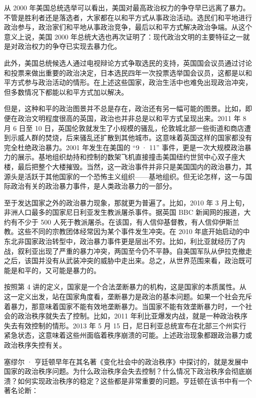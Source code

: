 从 2000 年美国总统选举可以看出，美国对最高政治权力的争夺早已远离了暴力。不管是胜利者还是落选者，大家都在以和平方式从事政治活动。选民们和平地进行政治参与，政治家们和平地从事政治竞争，最后以和平方式解决政治争端。从这个意义上说，美国 2000 年总统大选也再次证明了：现代政治文明的主要特征之一就是对政治权力的争夺已实现去暴力化。

此外，美国总统候选人通过电视辩论方式争取选民的支持，英国国会议员通过讨论和投票来做出重要的政治决定，日本选民四年一次投票选举国会议员，这都是以和平方式参与政治活动的情形。在上述这些国家，政治生活中也难免出现政治冲突，但多数情况下都能以和平方式加以解决。

但是，这种和平的政治图景并不总是存在，政治还有另一幅可能的图景。比如，即便在政治文明程度很高的英国，政治也并非总是以和平方式呈现出来。2011 年 8 月 6 日至 10 日，英国伦敦就发生了小规模的骚乱，伦敦城北部一些街道和商店遭到示威人群的焚烧，后来骚乱还扩散到其他城市。这意味着英国这样的国家都没有完全杜绝政治暴力。2001 年发生在美国的 “9 · 11” 事件，更是一次大规模政治暴力的展示。基地组织劫持和控制的数架飞机直接撞击美国纽约世贸中心双子座大楼，最后把整个大楼摧毁。当然，这一政治事件并非只是美国国内的政治暴力，其源头是活跃于其他国家的一个恐怖主义组织——基地组织。但无论怎样，这一与国际政治有关的政治暴力事件，是人类政治暴力的一部分。

至于发达国家之外的政治暴力现象，那就更为普遍了。比如，2010 年 3 月上旬，非洲人口最多的国家尼日利亚发生教派屠杀事件。据英国 BBC 新闻网的报道，大约有不少于 500 人死于教派屠杀。在该国，有人信仰基督教，有人信仰伊斯兰教。这些不同的宗教团体经常因为某个事件发生冲突。在 2010 年底开始启动的中东北非国家政治转型中，政治暴力事件更是层出不穷。比如，利比亚就经历了内战，叙利亚出现了严重的暴力冲突，两国至今仍不平静。自美国军队从伊拉克撤走之后，该国并没有从武装冲突的威胁中走出来。总之，从世界范围来看，政治既可能是和平的，又可能是暴力的。


按照第 4 讲的定义，国家是一个合法垄断暴力的机构，这是国家的本质属性。从这一定义出发，站在国家角度看，垄断暴力是政治的基本问题。如果一个社会充斥着暴力，那意味着国家不能有效地垄断暴力。当国家不能有效垄断暴力时，一个社会的政治秩序就失去了控制。比如，2011 年利比亚爆发内战，就是一种政治秩序失去有效控制的情形。2013 年 5 月 15 日，尼日利亚总统宣布在北部三个州实行紧急状态，这意味着这些州面临着秩序崩溃的可能。上述政治现象都跟政治暴力或政治秩序失控有关。

塞缪尔 · 亨廷顿早年在其名著《变化社会中的政治秩序》中探讨的，就是发展中国家的政治秩序问题。为什么政治秩序会失去控制？什么情况下政治秩序会彻底崩溃？如何实现政治秩序的稳定？这些都是非常重要的问题。亨廷顿在该书中有一个著名论断：

